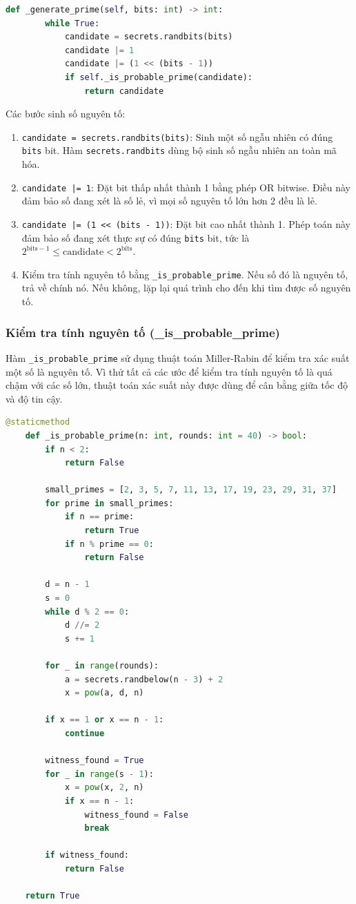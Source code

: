 \begin{lstlisting}[language=Python]
	def _generate_prime(self, bits: int) -> int:
		while True:
			candidate = secrets.randbits(bits)
			candidate |= 1
			candidate |= (1 << (bits - 1))
			if self._is_probable_prime(candidate):
				return candidate
\end{lstlisting}

Các bước sinh số nguyên tố:
\begin{enumerate}[label=\textbf{Bước \arabic*.}]
	\item \texttt{candidate = secrets.randbits(bits)}: Sinh một số ngẫu nhiên có đúng \texttt{bits} bit. Hàm \texttt{secrets.randbits} dùng bộ sinh số ngẫu nhiên an toàn mã hóa.
	\item \texttt{candidate |= 1}: Đặt bit thấp nhất thành 1 bằng phép OR bitwise. Điều này đảm bảo số đang xét là số lẻ, vì mọi số nguyên tố lớn hơn 2 đều là lẻ.
	\item \texttt{candidate |= (1 << (bits - 1))}: Đặt bit cao nhất thành 1. Phép toán này đảm bảo số đang xét thực sự có đúng \texttt{bits} bit, tức là $2^{\text{bits}-1} \leq \text{candidate} < 2^{\text{bits}}$.
	\item Kiểm tra tính nguyên tố bằng \texttt{\_is\_probable\_prime}. Nếu số đó là nguyên tố, trả về chính nó. Nếu không, lặp lại quá trình cho đến khi tìm được số nguyên tố.
\end{enumerate}

\subsubsection{Kiểm tra tính nguyên tố (\_is\_probable\_prime)}
Hàm \texttt{\_is\_probable\_prime} sử dụng thuật toán Miller-Rabin để kiểm tra xác suất một số là nguyên tố. Vì thử tất cả các ước để kiểm tra tính nguyên tố là quá chậm với các số lớn, thuật toán xác suất này được dùng để cân bằng giữa tốc độ và độ tin cậy.

\begin{lstlisting}[language=Python]
	@staticmethod
	def _is_probable_prime(n: int, rounds: int = 40) -> bool:
		if n < 2:
			return False
	
		small_primes = [2, 3, 5, 7, 11, 13, 17, 19, 23, 29, 31, 37]
		for prime in small_primes:
			if n == prime:
				return True
			if n % prime == 0:
				return False
	
		d = n - 1
		s = 0
		while d % 2 == 0:
			d //= 2
			s += 1
	
		for _ in range(rounds):
			a = secrets.randbelow(n - 3) + 2
			x = pow(a, d, n)
	
		if x == 1 or x == n - 1:
			continue
	
		witness_found = True
		for _ in range(s - 1):
			x = pow(x, 2, n)
			if x == n - 1:
				witness_found = False
				break
	
		if witness_found:
			return False
	
	return True
\end{lstlisting}

